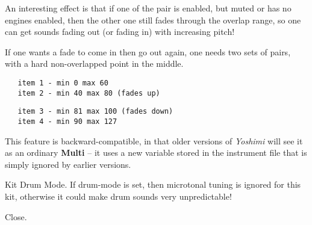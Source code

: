    An interesting effect is that if one of the pair is enabled, but muted or
   has no engines enabled, then the other one still fades through the overlap
   range, so one can get sounds fading out (or fading in) with increasing
   pitch!

   If one wants a fade to come in then go out again, one needs two sets of pairs,
   with a hard non-overlapped point in the middle.

   \begin{verbatim}
   item 1 - min 0 max 60
   item 2 - min 40 max 80 (fades up)
   \end{verbatim}

   \begin{verbatim}
   item 3 - min 81 max 100 (fades down)
   item 4 - min 90 max 127
   \end{verbatim}

   This feature is backward-compatible, in that older versions of
   \textsl{Yoshimi} will
   see it as an ordinary \textbf{Multi} -- it uses a new variable stored in the
   instrument file that is simply ignored by earlier versions.

   Kit Drum Mode.
   If drum-mode  is set, then microtonal tuning is ignored for this kit,
   otherwise it could make drum sounds very unpredictable!

   Close.

\iffalse   Direct accces is no longer available
   \index{kit!direct access}
   \index{direct access!kit}
   Once kit mode is set, some direct-access to the kit mode is available.
   We'll set it to 'multi'.

   \begin{verbatim}
      direct 1 64 58 0
   \end{verbatim}

   Kit item 1 is always enabled, although one can mute it and enable/disable the
   individual engines.  To be clear, though, we'll enable kit item 3 and work
   with that; add 32 to the kit number to get 35:

   \begin{verbatim}
      direct 1 64 8 0 35
      direct 56 64 16 0 35             // set its minimum note
      direct 1 64 8 0 35 1             // enable the subsynth engine
      direct 40 64 0 0 3 1             // change its volume
   \end{verbatim}

   Note one adds 32 only for the kit item commands, not for the engine internal
   commands.
\fi

